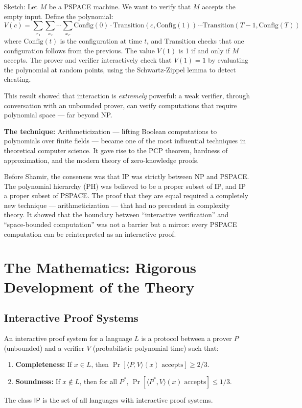 Sketch: Let $M$ be a PSPACE machine. We want to verify that $M$ accepts the empty input. Define the polynomial:
\[
V(c) = \sum_{x_1} \sum_{x_2} \cdots \sum_{x_T} \text{Config}(0) \cdot \text{Transition}(c, \text{Config}(1)) \cdots \text{Transition}(T-1, \text{Config}(T))
\]
where $\text{Config}(t)$ is the configuration at time $t$, and $\text{Transition}$ checks that one configuration follows from the previous. The value $V(1)$ is 1 if and only if $M$ accepts. The prover and verifier interactively check that $V(1) = 1$ by evaluating the polynomial at random points, using the Schwartz-Zippel lemma to detect cheating.

This result showed that interaction is \emph{extremely} powerful: a weak verifier, through conversation with an unbounded prover, can verify computations that require polynomial space --- far beyond NP.

\textbf{The technique:} Arithmeticization --- lifting Boolean computations to polynomials over finite fields --- became one of the most influential techniques in theoretical computer science. It gave rise to the PCP theorem, hardness of approximation, and the modern theory of zero-knowledge proofs.

Before Shamir, the consensus was that IP was strictly between NP and PSPACE. The polynomial hierarchy (PH) was believed to be a proper subset of IP, and IP a proper subset of PSPACE. The proof that they are equal required a completely new technique --- arithmeticization --- that had no precedent in complexity theory. It showed that the boundary between ``interactive verification'' and ``space-bounded computation'' was not a barrier but a mirror: every PSPACE computation can be reinterpreted as an interactive proof.

\section{The Mathematics: Rigorous Development of the Theory}
\label{sec:ip:math}

\subsection{Interactive Proof Systems}

\begin{definition}
An interactive proof system for a language $L$ is a protocol between a prover $P$ (unbounded) and a verifier $V$ (probabilistic polynomial time) such that:
\begin{enumerate}
\item \textbf{Completeness:} If $x \in L$, then $\Pr[\langle P, V \rangle(x) \text{ accepts}] \ge 2/3$.
\item \textbf{Soundness:} If $x \notin L$, then for all $P^*$, $\Pr[\langle P^*, V \rangle(x) \text{ accepts}] \le 1/3$.
\end{enumerate}
The class $\mathsf{IP}$ is the set of all languages with interactive proof systems.
\end{definition}

